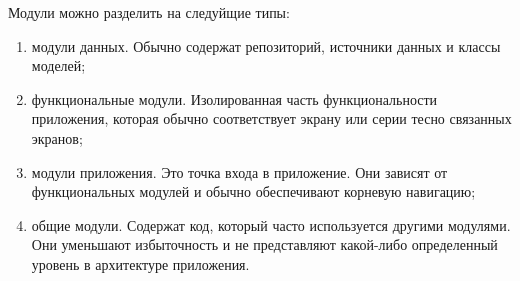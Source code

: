Модули можно разделить на следуйщие типы:

\begin{enumerate}
    \item модули данных. Обычно содержат репозиторий, источники данных и классы моделей;
    \item функциональные модули. Изолированная часть функциональности приложения, которая обычно соответствует экрану или серии тесно связанных экранов;
    \item модули приложения. Это точка входа в приложение. Они зависят от функциональных модулей и обычно обеспечивают корневую навигацию;
    \item общие модули. Содержат код, который часто используется другими модулями. Они уменьшают избыточность и не представляют какой-либо определенный уровень в архитектуре приложения.
\end{enumerate}